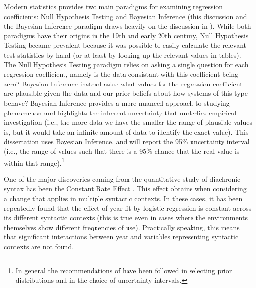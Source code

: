 	Modern statistics provides two main paradigms for examining regression coefficients: Null Hypothesis Testing and Bayesian Inference (this discussion and the Bayesian Inference paradigm draws heavily on the discussion in \citealt{Kruschke.2010}). While both paradigms have their origins in the 19th and early 20th century, Null Hypothesis Testing became prevalent because it was possible to easily calculate the relevant test statistics by hand (or at least by looking up the relevant values in tables). The Null Hypothesis Testing paradigm relies on asking a single question for each regression coefficient, namely is the data consistant with this coefficient being zero? Bayesian Inference instead asks: what values for the regression coefficient are plausible given the data and our prior beliefs about how systems of this type behave? Bayesian Inference provides a more nuanced approach to studying phenomenon and highlights the inherent uncertainty that underlies empirical investigation (i.e., the more data we have the smaller the range of plausible values is, but it would take an infinite amount of data to identify the exact value). This dissertation uses Bayesian Inference, and will report the 95\% uncertainty interval (i.e., the range of values such that there is a 95\% chance that the real value is within that range).\footnote{In general the recommendations of \cite{Gelman.2008} have been followed in selecting prior distributions and in the choice of uncertainty intervals.}

	One of the major discoveries coming from the quantitative study of diachronic syntax has been the Constant Rate Effect \citep{Kroch.1989,Kroch.1994}. This effect obtains when considering a change that applies in multiple syntactic contexts. In these cases, it has been repeatedly found that the effect of year fit by logistic regression is constant across its different syntactic contexts (this is true even in cases where the environments themselves show different frequencies of use). Practically speaking, this means that significant interactions between year and variables representing syntactic contexts are not found.

